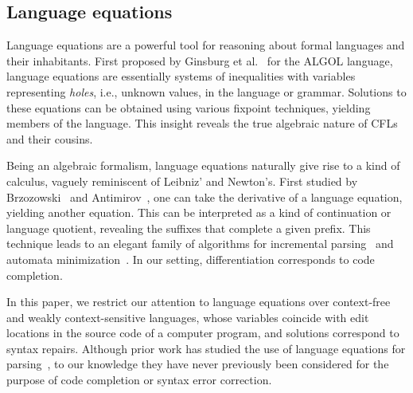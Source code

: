 \documentclass[sigplan,review,anonymous,acmsmall]{acmart}\settopmatter{printfolios=false,printccs=false,printacmref=false}
\begin{document}


\subsection{Language equations}

Language equations are a powerful tool for reasoning about formal languages and their inhabitants. First proposed by Ginsburg et al.~\cite{ginsburg1962two} for the ALGOL language, language equations are essentially systems of inequalities with variables representing \textit{holes}, i.e., unknown values, in the language or grammar. Solutions to these equations can be obtained using various fixpoint techniques, yielding members of the language. This insight reveals the true algebraic nature of CFLs and their cousins.

Being an algebraic formalism, language equations naturally give rise to a kind of calculus, vaguely reminiscent of Leibniz' and Newton's. First studied by Brzozowski~\cite{brzozowski1964derivatives, brzozowski1980equations} and Antimirov~\cite{antimirov1996partial}, one can take the derivative of a language equation, yielding another equation. This can be interpreted as a kind of continuation or language quotient, revealing the suffixes that complete a given prefix. This technique leads to an elegant family of algorithms for incremental parsing~\cite{might2011parsing, adams2016complexity} and automata minimization~\cite{brzozowski1962canonical}. In our setting, differentiation corresponds to code completion.

In this paper, we restrict our attention to language equations over context-free and weakly context-sensitive languages, whose variables coincide with edit locations in the source code of a computer program, and solutions correspond to syntax repairs. Although prior work has studied the use of language equations for parsing~\cite{might2011parsing}, to our knowledge they have never previously been considered for the purpose of code completion or syntax error correction.


\end{document}
